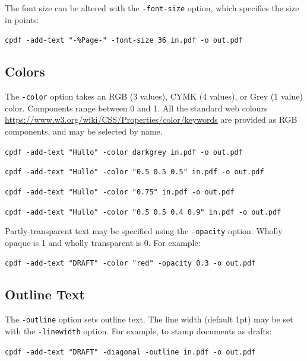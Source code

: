 \documentclass{book}
\begin{document}
The font size can be altered with the \texttt{-font-size} option, which
specifies the size in points:
  \begin{framed}
    \noindent\small\verb!cpdf -add-text "-%Page-" -font-size 36 in.pdf -o out.pdf!
  \end{framed}

  \subsection{Colors}
  The \texttt{-color} option takes an RGB (3 values), CYMK (4 values), or Grey (1 value) color. Components range between 0 and 1. All the standard web colours \url{https://www.w3.org/wiki/CSS/Properties/color/keywords} are provided as RGB components, and may be selected by name.

  \begin{framed}
    \noindent\small\verb!cpdf -add-text "Hullo" -color darkgrey in.pdf -o out.pdf!
    
    \vspace{1.5mm}
    \noindent\small\verb!cpdf -add-text "Hullo" -color "0.5 0.5 0.5" in.pdf -o out.pdf!

    \vspace{1.5mm}
    \noindent\small\verb!cpdf -add-text "Hullo" -color "0.75" in.pdf -o out.pdf!

    \vspace{1.5mm}
    \noindent\small\verb!cpdf -add-text "Hullo" -color "0.5 0.5 0.4 0.9" in.pdf -o out.pdf!
  \end{framed}

\noindent Partly-transparent text may be specified using the \verb!-opacity! option. Wholly opaque is 1 and wholly transparent is 0. For example:

\begin{framed}
  \noindent\small\verb!cpdf -add-text "DRAFT" -color "red" -opacity 0.3 -o out.pdf!
\end{framed}

\subsection{Outline Text}

  The \texttt{-outline} option sets outline text. The line width (default 1pt)
  may be set with the \texttt{-linewidth} option. For example, to stamp
  documents as drafts:

  \begin{framed}
    \noindent\small\verb!cpdf -add-text "DRAFT" -diagonal -outline in.pdf -o out.pdf!
    
  \end{framed}
\end{document}

